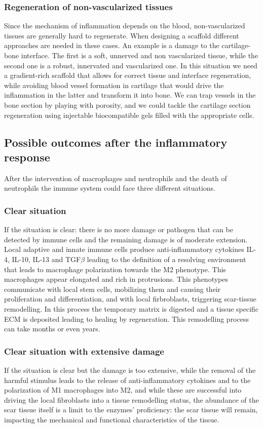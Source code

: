 		\subsubsection{Regeneration of non-vascularized tissues}
		Since the mechanism of inflammation depends on the blood, non-vascularized tissues are generally hard to regenerate.
		When designing a scaffold different approaches are needed in these cases.
		An example is a damage to the cartilage-bone interface.
		The first is a soft, unnerved and non vascularized tissue, while the second one is a robust, innervated and vascularized one.
		In this situation we need a gradient-rich scaffold that allows for correct tissue and interface regeneration, while avoiding blood vessel formation in cartilage that would drive the inflammation in the latter and transform it into bone.
		We can trap vessels in the bone section by playing with porosity, and we could tackle the cartilage section regeneration using injectable biocompatible gels filled with the appropriate cells.

	\subsection{Possible outcomes after the inflammatory response}
	After the intervention of macrophages and neutrophils and the death of neutrophils the immune system could face three different situations.

		\subsubsection{Clear situation}
		If the situation is clear: there is no more damage or pathogen that can be detected by immune cells and the remaining damage is of moderate extension.
		Local adaptive and innate immune cells produce anti-inflammatory cytokines IL-4, IL-10, IL-13 and TGF$\beta$ leading to the definition of a resolving environment that leads to macrophage polarization towards the M2 phenotype.
		This macrophages appear elongated and rich in protrusions.
		This phenotypes communicate with local stem cells, mobilizing them and causing their proliferation and differentiation, and with local firbroblasts, triggering scar-tissue remodelling.
		In this process the temporary matrix is digested and a tissue specific ECM is deposited leading to healing by regeneration.
		This remodelling process can take months or even years.

		\subsubsection{Clear situation with extensive damage}
		If the situation is clear but the damage is too extensive, while the removal of the harmful stimulus leads to the release of anti-inflammatory cytokines and to the polarization of M1 macrophages into M2, and while these are successful into driving the local fibroblasts into a tissue remodelling status, the abundance of the scar tissue itself is a limit to the enzymes’ proficiency: the scar tissue will remain, impacting the mechanical and functional characteristics of the tissue.

